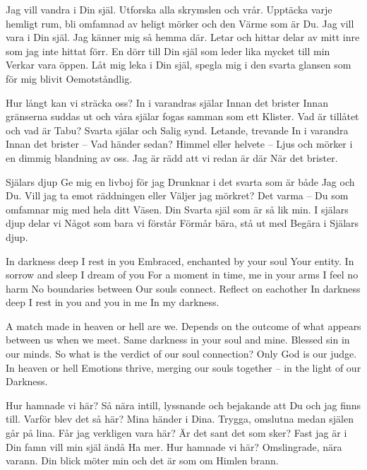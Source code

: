 \startpoem
Jag vill vandra i Din själ.
Utforska alla skrymslen och vrår.
Upptäcka varje hemligt rum,
bli omfamnad av heligt mörker och den
Värme som är Du. 
Jag vill vara i Din själ.
Jag känner mig så hemma där.
Letar och hittar delar av mitt inre som
jag inte hittat förr.
En dörr till Din själ som leder lika mycket
till min
Verkar vara öppen.
Låt mig leka i Din själ,
spegla mig i den svarta glansen som för mig blivit
Oemotståndlig.
\stoppoem

\startpoem
Hur långt kan vi sträcka oss?
In i varandras själar
Innan det brister
Innan gränserna suddas ut
och våra själar fogas samman som ett
Klister.
Vad är tillåtet och vad är
Tabu?
Svarta själar och Salig synd.
Letande, trevande
In i varandra
Innan det brister – 
Vad händer sedan?
Himmel eller helvete – 
Ljus och mörker i en 
dimmig blandning av oss.
Jag är rädd att vi redan är där
När det brister.
\stoppoem

\startpoem
Själars djup
Ge mig en livboj för jag 
Drunknar i det svarta som är både
Jag och Du.
Vill jag ta emot räddningen eller
Väljer jag mörkret?
Det varma – Du
som omfamnar mig med hela ditt
Väsen.
Din Svarta själ som är så lik min.
I själars djup delar vi 
Något som bara vi förstår
Förmår bära, stå ut med
Begära i 
Själars djup.
\stoppoem

\startpoem
In darkness deep
I rest in you
Embraced, enchanted by your soul
Your entity.
In sorrow and sleep
I dream of you
For a moment in time, me in your arms
I feel no harm
No boundaries between
Our souls connect.
Reflect on eachother
In darkness deep
I rest in you and you in me
In my darkness.
\stoppoem

\startpoem
A match made in heaven or hell
are we.
Depends on the outcome of
what appears between us 
when we meet.
Same darkness in your soul and mine.
Blessed sin in our minds.
So what is the verdict of our soul connection?
Only God is our judge.
In heaven or hell
Emotions thrive,
merging our souls together – 
in the light of our 
Darkness.
\stoppoem

\startpoem
Hur hamnade vi här?
Så nära intill,
lyssnande och bejakande att 
Du och jag finns till.
Varför blev det så här?
Mina händer i Dina.
Trygga, omslutna medan        
själen går på lina.
Får jag verkligen vara här? 
Är det sant det som sker?
Fast jag är i Din famn vill min själ ändå
Ha mer.
Hur hamnade vi här?
Omslingrade, nära varann.
Din blick möter min och det är som om 
Himlen brann.
\stoppoem

